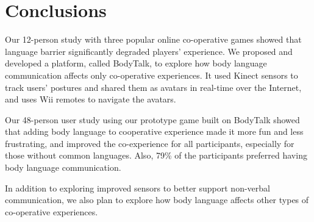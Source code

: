 \section{Conclusions}




Our 12-person study with three popular online co-operative games showed that language barrier significantly degraded players' experience. 
We proposed and developed a platform, called BodyTalk, to explore how body language communication affects only co-operative experiences. It used Kinect sensors to track users’ postures and shared them as avatars in real-time over the Internet, and uses Wii remotes to navigate the avatars. 

Our 48-person user study using our prototype game built on BodyTalk showed that adding body language to cooperative experience made it more fun and less frustrating, and improved the co-experience for all participants, especially for those without common languages. Also, 79\% of the participants preferred having body language communication.

In addition to exploring improved sensors to better support non-verbal communication, we also plan to explore how body language affects other types of co-operative experiences.


